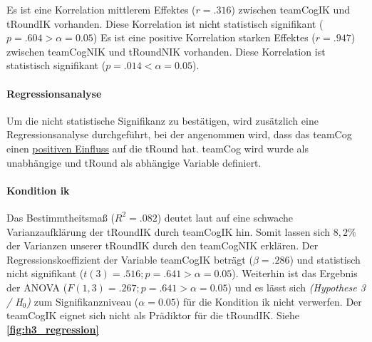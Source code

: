 \documentclass[a4paper,11pt]{article}%
\renewcommand{\\}{\vspace*{0.5\baselineskip} \newline}
\begin{document}
Es ist eine Korrelation mittlerem Effektes ($r = .316$) zwischen \ac{teamCogIK} und \ac{tRoundIK} vorhanden. Diese Korrelation ist nicht statistisch signifikant ($p = .604 > \alpha = 0.05$)
Es ist eine positive Korrelation starken Effektes ($r = .947$) zwischen \ac{teamCogNIK} und \ac{tRoundNIK} vorhanden. Diese Korrelation ist statistisch signifikant ($p = .014 < \alpha = 0.05$). 

\paragraph{Regressionsanalyse}
Um die nicht statistische Signifikanz zu bestätigen, wird zusätzlich eine Regressionsanalyse durchgeführt, bei der angenommen wird, dass das \ac{teamCog} einen \underline{positiven Einfluss} auf die \ac{tRound} hat.
\ac{teamCog} wird wurde als unabhängige und \ac{tRound} als abhängige Variable definiert.

\paragraph{Kondition \ac{ik}}
Das Bestimmtheitsmaß ($R^{2} = .082$) deutet laut \citep{cohen2013statistical} auf eine schwache Varianzaufklärung der \ac{tRoundIK} durch \ac{teamCogIK} hin. Somit lassen sich $8,2\%$ der Varianzen unserer \ac{tRoundIK} durch den \ac{teamCogNIK} erklären. \\
Der Regressionskoeffizient der Variable \ac{teamCogIK} beträgt ($\beta = .286$) und statistisch nicht signifikant ($t(3) = .516; p = .641 > \alpha = 0.05$). \\
Weiterhin ist das Ergebnis der ANOVA ($F(1,3) = .267; p = .641 > \alpha = 0.05$) und es lässt sich \textit{(Hypothese 3 / H$_{0}$)} zum Signifikanzniveau ($\alpha = 0.05$) für die Kondition \ac{ik} nicht verwerfen. \\
Der \ac{teamCogIK} eignet sich nicht als Prädiktor für die \ac{tRoundIK}.
Siehe \textbf{\autoref{fig:h3_regression}}
\end{document}
